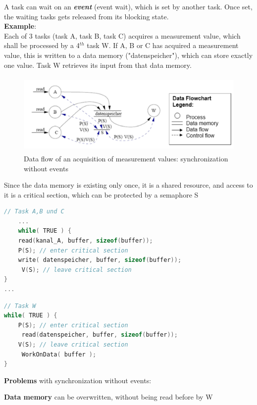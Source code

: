 A task can wait on an \textbf{\textit{event}} (event wait), which is set by another task. Once set, the waiting tasks gets released from its blocking state.\\

\textbf{Example}: \\
Each of 3 tasks (task A, task B, task C) acquires a measurement value, which shall be processed by a 4${}^{th}$ task W. If A, B or C has acquired a measurement value, this is written to a data memory ("datenspeicher"), which can store exactly one value. Task W retrieves its input from that data memory.

 	\begin{figure}[h]
    \centering
    \includegraphics[width=13cm, height=4cm]{Images/image111.png}
    \caption{Data flow of an acquisition of measurement values: synchronization without events}
    \label{fig:Fig 57}
    \end{figure}
\os{\newpage}

Since the data memory  is existing only once, it is a shared resource, and access to it is a critical section, which can be protected by a semaphore S\\

\begin{lstlisting}[style=mystyle, language=c]
// Task A,B und C
	...
	while( TRUE ) {
  	read(kanal_A, buffer, sizeof(buffer));
  	P(S); // enter critical section
  	write( datenspeicher, buffer, sizeof(buffer));
 	 V(S); // leave critical section
}
...
\end{lstlisting}

\begin{lstlisting}[style=mystyle, language=c]
// Task W
while( TRUE ) {
  	P(S); // enter critical section
 	 read(datenspeicher, buffer, sizeof(buffer));
  	V(S); // leave critical section
 	 WorkOnData( buffer );
}
\end{lstlisting}

\textbf{Problems} with synchronization without events:

\hspace{1cm} \textbf{Data memory} can be overwritten, without being read before by W
 
